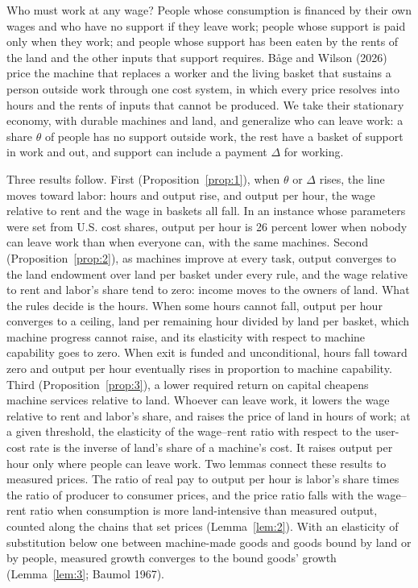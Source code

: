\documentclass[12pt]{article}
\theoremstyle{plain}
\begin{document}
Who must work at any wage? People whose consumption is financed by their own wages and who have no support if they leave work; people whose support is paid only when they work; and people whose support has been eaten by the rents of the land and the other inputs that support requires. B\r{a}ge and Wilson (2026) price the machine that replaces a worker and the living basket that sustains a person outside work through one cost system, in which every price resolves into hours and the rents of inputs that cannot be produced. We take their stationary economy, with durable machines and land, and generalize who can leave work: a share $\theta$ of people has no support outside work, the rest have a basket of support in work and out, and support can include a payment $\Delta$ for working.

Three results follow. First (Proposition~\ref{prop:1}), when $\theta$ or $\Delta$ rises, the line moves toward labor: hours and output rise, and output per hour, the wage relative to rent and the wage in baskets all fall. In an instance whose parameters were set from U.S. cost shares, output per hour is 26 percent lower when nobody can leave work than when everyone can, with the same machines. Second (Proposition~\ref{prop:2}), as machines improve at every task, output converges to the land endowment over land per basket under every rule, and the wage relative to rent and labor's share tend to zero: income moves to the owners of land. What the rules decide is the hours. When some hours cannot fall, output per hour converges to a ceiling, land per remaining hour divided by land per basket, which machine progress cannot raise, and its elasticity with respect to machine capability goes to zero. When exit is funded and unconditional, hours fall toward zero and output per hour eventually rises in proportion to machine capability. Third (Proposition~\ref{prop:3}), a lower required return on capital cheapens machine services relative to land. Whoever can leave work, it lowers the wage relative to rent and labor's share, and raises the price of land in hours of work; at a given threshold, the elasticity of the wage--rent ratio with respect to the user-cost rate is the inverse of land's share of a machine's cost. It raises output per hour only where people can leave work. Two lemmas connect these results to measured prices. The ratio of real pay to output per hour is labor's share times the ratio of producer to consumer prices, and the price ratio falls with the wage--rent ratio when consumption is more land-intensive than measured output, counted along the chains that set prices (Lemma~\ref{lem:2}). With an elasticity of substitution below one between machine-made goods and goods bound by land or by people, measured growth converges to the bound goods' growth (Lemma~\ref{lem:3}; Baumol 1967).
\end{document}
